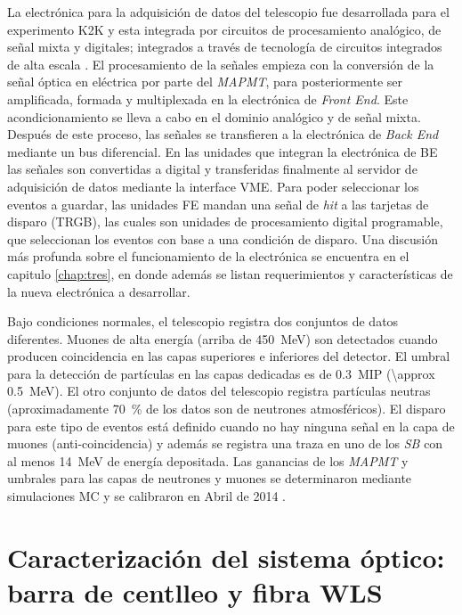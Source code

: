 La electrónica para la adquisición de datos del telescopio fue desarrollada para el experimento K2K y esta integrada por circuitos de procesamiento analógico, de señal mixta y digitales; integrados a través de tecnología de circuitos integrados de alta escala \cite{myoshi04}. El procesamiento de la señales empieza con la conversión de la señal óptica en eléctrica por parte del \emph{MAPMT}, para posteriormente ser amplificada, formada y multiplexada en la electrónica de \emph{Front End}. Este acondicionamiento se lleva a cabo en el dominio analógico y de señal mixta. Después de este proceso, las señales se transfieren a la electrónica de \emph{Back End} mediante un bus diferencial. En las unidades que integran la electrónica de BE las señales son convertidas a digital y transferidas finalmente al servidor de adquisición de datos mediante la interface VME. Para poder seleccionar los eventos a guardar, las unidades FE mandan una señal de \emph{hit} a las tarjetas de disparo (TRGB), las cuales son unidades de procesamiento digital programable, que seleccionan los eventos con base a una condición de disparo. Una discusión más profunda sobre el funcionamiento de la electrónica se encuentra en el capitulo \ref{chap:tres}, en donde además se listan requerimientos y características de la nueva electrónica a desarrollar.

Bajo condiciones normales, el telescopio registra dos conjuntos de datos diferentes. Muones de alta energía (arriba de \SI{450}{\mega\electronvolt}) son detectados cuando producen coincidencia en las capas superiores e inferiores del detector. El umbral para la detección de partículas en las capas dedicadas es de \SI{0.3}{MIP} (\SI{\approx 0.5}{\mega\electronvolt}). El otro conjunto de datos del telescopio registra partículas neutras (aproximadamente \SI{70}{\percent} de los datos son de neutrones atmosféricos). El disparo para este tipo de eventos está definido cuando no hay ninguna señal en la capa de muones (anti-coincidencia) y además se registra una traza en uno de los \emph{SB} con al menos \SI{14}{\mega\electronvolt} de energía depositada. Las ganancias de los \emph{MAPMT} y umbrales para las capas de neutrones y muones se determinaron mediante simulaciones MC y se calibraron en Abril de \num{2014} \cite{ysasai14}.

\section{Caracterización del sistema óptico: barra de centlleo y fibra WLS}

